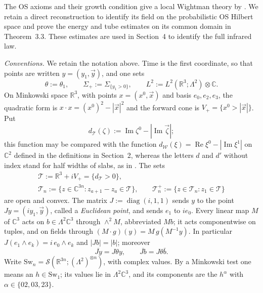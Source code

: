 \documentclass[11pt,letterpaper,reqno]{amsart}
\theoremstyle{definition}
\begin{document}
The OS axioms and their growth condition give a local Wightman theory
by \cite[Section~IV.1]{OS1975}. We retain a direct reconstruction to
identify its field on the probabilistic OS Hilbert space and prove
the energy and tube estimates on its common domain in Theorem~3.3. These
estimates are used in Section~4 to identify the full infrared law.

\emph{Conventions.}
We retain the notation above.
Time is the first coordinate, so that points are written $y=(y_1,\vec y)$, and one sets
\begin{equation*}
\theta:=\theta_1,\qquad \Sigma_+:=\Sigma_{\{y_1>0\}},\qquad L^2:=L^2(\mathbb R^3;\Lambda^2)\otimes\mathbb C.
\end{equation*}
On Minkowski space $\mathbb R^3$, with points $x=(x^0,\vec x)$ and basis $e_0,e_2,e_3$, the quadratic form is $x\cdot x=(x^0)^2-|\vec x|^2$ and the forward cone is $V_+=\{x^0>|\vec x|\}$.
Put
\begin{equation*}
d_{\mathcal T}(\zeta):=\operatorname{Im}\zeta^0-|\operatorname{Im}\vec\zeta|;
\end{equation*}
this function may be compared with the function $d_{\mathcal W}(\xi)=\allowbreak \operatorname{Re}\xi^0-|\operatorname{Im}\xi^1|$ on $\mathbb C^2$ defined in the definitions in Section~2, whereas the letters $d$ and $d'$ without index stand for half widths of slabs, as in \cite[Proposition~8.1]{QEDConstruction}.
The sets
\begin{gather*}
\mathcal T:=\mathbb R^3+iV_+=\{d_{\mathcal T}>0\},\\
\mathcal T_n:=\{z\in\mathbb C^{3n}:z_{a+1}-z_a\in\mathcal T\},\qquad \mathcal T_n^+:=\{z\in\mathcal T_n:z_1\in\mathcal T\}
\end{gather*}
are open and convex.
The matrix $J:=\operatorname{diag}(i,1,1)$ sends $y$ to the point $Jy=(iy_1,\vec y)$, called a \emph{Euclidean point}, and sends $e_1$ to $ie_0$.
Every linear map $M$ of $\mathbb C^3$ acts on $b\in\Lambda^2\mathbb C^3$ through $\wedge^2M$, abbreviated $Mb$; it acts componentwise on tuples, and on fields through $(M\cdot g)(y)=M\,g(M^{-1}y)$.
In particular $J(e_1\wedge e_k)=i\,e_0\wedge e_k$ and $|Jb|=|b|$; moreover
\begin{equation}
\overline{Jy}=J\theta y,\qquad \overline{Jb}=J\theta\bar b.
\tag{K}
\end{equation}
Write $\mathrm{Sw}_n=\mathcal S(\mathbb R^{3n};(\Lambda^2)^{\otimes n})$, with complex values.
By a Minkowski test one means an $h\in\mathrm{Sw}_1$; its values lie in $\Lambda^2\mathbb C^3$, and its components are the $h^\alpha$ with $\alpha\in\{02,03,23\}$.
\end{document}
